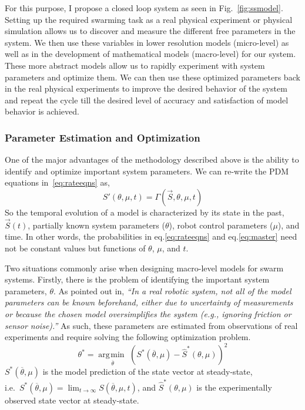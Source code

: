 \documentclass[11pt, onecolumn, compsoc, letterpaper]{article}
\DeclareMathOperator*{\argmin}{\arg\!\min\>}
\begin{document}
For this purpose, I propose a closed loop system as seen in Fig.~\ref{fig:ssmodel}. Setting up the required swarming task as a real physical experiment or physical simulation allows us to discover and measure the different free parameters in the system. We then use these variables in lower resolution models (micro-level) as well as in the development of mathematical models (macro-level) for our system. These more abstract models allow us to rapidly experiment with system parameters and optimize them. We can then use these optimized parameters back in the real physical experiments to improve the desired behavior of the system and repeat the cycle till the desired level of accuracy and satisfaction of  model behavior is achieved.

\subsubsection{Parameter Estimation and Optimization}
One of the major advantages of the methodology described above is the ability to identify and optimize important system parameters. We can re-write the PDM equations in~\eqref{eq:rateeqns} as,
\begin{equation}
S'(\theta,\mu,t) = \Gamma\left(\vec{S}, \theta, \mu, t\right)
\end{equation}
So the temporal evolution of a model is characterized by its state in the past, $\vec{S}(t)$, partially known system parameters ($\theta$), robot control parameters ($\mu$), and time. In other words, the probabilities in eq.\eqref{eq:rateeqns} and eq.\eqref{eq:master} need not be constant values but functions of $\theta$, $\mu$, and $t$.

Two situations commonly arise when designing macro-level models for swarm systems. Firstly, there is the problem of identifying the important system parameters, $\theta$. As pointed out in\cite{Correll2008}, \emph{``In a real robotic system, not all of the model parameters can be known beforehand, either due to uncertainty of measurements or because the chosen model oversimplifies the system (e.g., ignoring friction or sensor noise).''} As such, these parameters are estimated from observations of real experiments and require solving the following optimization problem.
\begin{equation}
	\theta^* = \underset{\overline{\theta}}{\argmin}\left(S^*(\overline{\theta},\mu) - \hat{S}^*(\theta, \mu)\right)^2 \label{eq:thetaopt}
\end{equation}
$S^*(\overline{\theta},\mu)$ is the model prediction of the state vector at steady-state,\\ i.e.~$S^*(\overline{\theta},\mu) = \lim_{t \to \infty}S(\overline{\theta},\mu, t)$, and $\hat{S}^*(\theta, \mu)$ is the experimentally observed state vector at steady-state.
\end{document}

